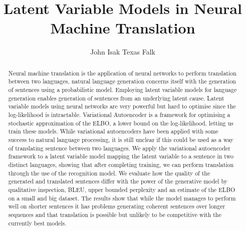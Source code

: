 \makeatletter
\renewcommand {\@degree@string} {Master of Science}
\makeatother

\title{Latent Variable Models in Neural Machine Translation}
\author{John Isak Texas Falk}

\maketitle

\leavevmode\thispagestyle{empty}\newpage


\begin{abstract}
  Neural machine translation is the application of neural networks to perform
  translation between two languages, natural language generation concerns itself
  with the generation of sentences using a probabilistic model. Employing latent
  variable models for language generation enables generation of sentences from
  an underlying latent cause. Latent variable models using neural
  networks are very powerful but hard to optimise since the log-likelihood is
  intractable. Variational Autoencoder is a framework for optimising a stochastic approximation of the
  ELBO, a lower bound on the log-likelihood, letting us train these models. While variational autoencoders have been applied with some success to natural language
  processing, it is still unclear if this could be used as a way of translating
  sentence between two languages. We apply the variational autoencoder framework
  to a latent variable model mapping the latent variable to a sentence in two
  distinct languages, showing that after completing training, we can perform
  translation through the use of the recognition model. We evaluate how the
  quality of the generated and translated sentences differ with the power of the
  generative model by qualitative inspection, BLEU, upper bounded perplexity and
  an estimate of the ELBO on a small and big dataset. The results show that
  while the model manages to perform well on shorter sentences it has problems
  generating coherent sentences over longer sequences and that translation is
  possible but unlikely to be competitive with the currently best models.
\end{abstract}

